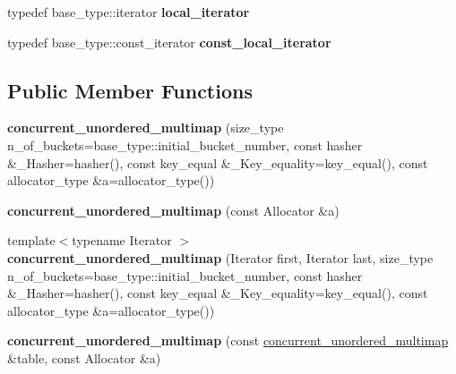 \begin{DoxyCompactItemize}
\item 
\hypertarget{classtbb_1_1interface5_1_1concurrent__unordered__multimap_a75ad2607efde410d591002203deb65e6}{}typedef base\+\_\+type\+::iterator {\bfseries local\+\_\+iterator}\label{classtbb_1_1interface5_1_1concurrent__unordered__multimap_a75ad2607efde410d591002203deb65e6}

\item 
\hypertarget{classtbb_1_1interface5_1_1concurrent__unordered__multimap_ab7647068dd628f35d3e3f7ed161b3fc0}{}typedef base\+\_\+type\+::const\+\_\+iterator {\bfseries const\+\_\+local\+\_\+iterator}\label{classtbb_1_1interface5_1_1concurrent__unordered__multimap_ab7647068dd628f35d3e3f7ed161b3fc0}

\end{DoxyCompactItemize}
\subsection*{Public Member Functions}
\begin{DoxyCompactItemize}
\item 
\hypertarget{classtbb_1_1interface5_1_1concurrent__unordered__multimap_a4ea5780bcc8664253e2180987bc775d0}{}{\bfseries concurrent\+\_\+unordered\+\_\+multimap} (size\+\_\+type n\+\_\+of\+\_\+buckets=base\+\_\+type\+::initial\+\_\+bucket\+\_\+number, const hasher \&\+\_\+\+Hasher=hasher(), const key\+\_\+equal \&\+\_\+\+Key\+\_\+equality=key\+\_\+equal(), const allocator\+\_\+type \&a=allocator\+\_\+type())\label{classtbb_1_1interface5_1_1concurrent__unordered__multimap_a4ea5780bcc8664253e2180987bc775d0}

\item 
\hypertarget{classtbb_1_1interface5_1_1concurrent__unordered__multimap_ae2fe78524a0f0cd268194cf2461e3ab0}{}{\bfseries concurrent\+\_\+unordered\+\_\+multimap} (const Allocator \&a)\label{classtbb_1_1interface5_1_1concurrent__unordered__multimap_ae2fe78524a0f0cd268194cf2461e3ab0}

\item 
\hypertarget{classtbb_1_1interface5_1_1concurrent__unordered__multimap_a174ad09d37e0f648e06ded3abfa65bed}{}{\footnotesize template$<$typename Iterator $>$ }\\{\bfseries concurrent\+\_\+unordered\+\_\+multimap} (Iterator first, Iterator last, size\+\_\+type n\+\_\+of\+\_\+buckets=base\+\_\+type\+::initial\+\_\+bucket\+\_\+number, const hasher \&\+\_\+\+Hasher=hasher(), const key\+\_\+equal \&\+\_\+\+Key\+\_\+equality=key\+\_\+equal(), const allocator\+\_\+type \&a=allocator\+\_\+type())\label{classtbb_1_1interface5_1_1concurrent__unordered__multimap_a174ad09d37e0f648e06ded3abfa65bed}

\item 
\hypertarget{classtbb_1_1interface5_1_1concurrent__unordered__multimap_a34148bd7279ce189a6c0c26380df0a2a}{}{\bfseries concurrent\+\_\+unordered\+\_\+multimap} (const \hyperlink{classtbb_1_1interface5_1_1concurrent__unordered__multimap}{concurrent\+\_\+unordered\+\_\+multimap} \&table, const Allocator \&a)\label{classtbb_1_1interface5_1_1concurrent__unordered__multimap_a34148bd7279ce189a6c0c26380df0a2a}

\end{DoxyCompactItemize}


